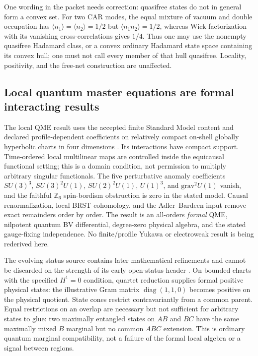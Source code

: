 \documentclass[11pt]{article}
\theoremstyle{definition}
\theoremstyle{remark}
\begin{document}
One wording in the packet needs correction: quasifree states do not in
general form a convex set. For two CAR modes, the equal mixture of vacuum
and double occupation has \(\langle n_1\rangle=\langle n_2\rangle=1/2\)
but \(\langle n_1n_2\rangle=1/2\), whereas Wick factorization with its
vanishing cross-correlations gives \(1/4\). Thus one may use the nonempty
quasifree Hadamard class, or a convex ordinary Hadamard state space containing
its convex hull; one must not call every member of that hull quasifree.
Locality, positivity, and the free-net construction are unaffected.

\subsection{Local quantum master equations are formal interacting results}
\label{sec:local-qme}
The local QME result uses the accepted finite Standard Model content and
declared profile-dependent coefficients on relatively compact on-shell
globally hyperbolic charts in four dimensions \cite{FrozenQME}. Its
interactions have compact support. Time-ordered local multilinear maps are
controlled inside the equicausal functional setting; this is a domain
condition, not permission to multiply arbitrary singular functionals.
The five perturbative anomaly coefficients
\(SU(3)^3\), \(SU(3)^2U(1)\), \(SU(2)^2U(1)\), \(U(1)^3\), and
\(\mathrm{grav}^2U(1)\)
vanish, and the faithful \(\mathbb Z_6\) spin-bordism obstruction is zero
in the stated model. Causal renormalization, local BRST cohomology, and the
Adler--Bardeen input remove exact remainders order by order. The result is
an all-orders \emph{formal} QME, nilpotent quantum BV differential,
degree-zero physical algebra, and the stated gauge-fixing independence.
No finite/profile Yukawa or electroweak result is being rederived here.

The evolving status source contains later mathematical refinements and
cannot be discarded on the strength of its early open-status header
\cite{FrozenQMStatus}. On bounded charts with the specified \(H^1=0\)
condition, quartet reduction supplies formal positive physical states: the
illustrative Gram matrix \(\operatorname{diag}(1,1,0)\) becomes positive on
the physical quotient. State cones restrict contravariantly from a common
parent. Equal restrictions on an overlap are necessary but not sufficient
for arbitrary states to glue: two maximally entangled states on \(AB\) and
\(BC\) have the same maximally mixed \(B\) marginal but no common \(ABC\)
extension. This is ordinary quantum marginal compatibility, not a failure
of the formal local algebra or a signal between regions.
\end{document}

